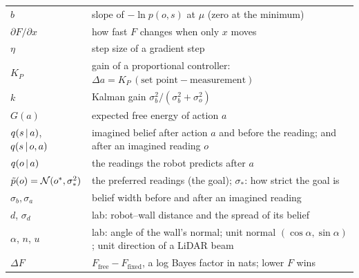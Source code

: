 \documentclass[11pt]{article}
\begin{document}
\begin{longtable}{@{}p{}p{}@{}}
$b$ & slope of $-\ln p(o,s)$ at $\mu$ (zero at the minimum) \\
$\partial F/\partial x$ & how fast $F$ changes when only $x$ moves \\
$\eta$ & step size of a gradient step \\
$K_P$ & gain of a proportional controller: $\Delta a = K_P\,(\text{set point}-\text{measurement})$ \\
$k$ & Kalman gain $\sigma_b^2/(\sigma_b^2+\sigma_o^2)$ \\
$G(a)$ & expected free energy of action $a$ \\
$q(s\,|\, a)$, $q(s\,|\, o,a)$ & imagined belief after action $a$ and before the reading; and after an imagined reading $o$ \\
$q(o\,|\, a)$ & the readings the robot predicts after $a$ \\
$\tilde p(o)=\mathcal{N}(o^*,\sigma_*^2)$ & the preferred readings (the goal); $\sigma_*$: how strict the goal is \\
$\sigma_b,\sigma_a$ & belief width before and after an imagined reading \\
$d$, $\sigma_d$ & lab: robot--wall distance and the spread of its belief \\
$\alpha$, $n$, $u$ & lab: angle of the wall's normal; unit normal $(\cos\alpha,\sin\alpha)$; unit direction of a LiDAR beam \\
$\Delta F$ & $F_{\text{free}}-F_{\text{fixed}}$, a log Bayes factor in nats; lower $F$ wins \\
\bottomrule
\end{longtable}
\end{document}
